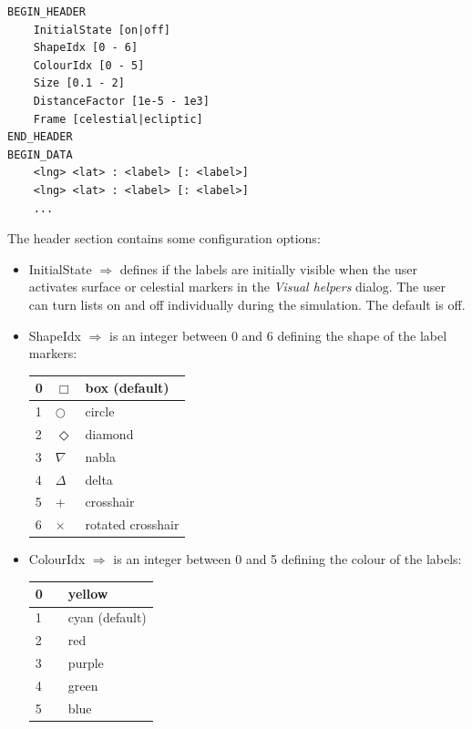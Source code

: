 \documentclass[Orbiter Developer Manual.tex]{subfiles}
\begin{document}
\begin{lstlisting}[language=OSFS]
BEGIN_HEADER
	InitialState [on|off]
	ShapeIdx [0 - 6]
	ColourIdx [0 - 5]
	Size [0.1 - 2]
	DistanceFactor [1e-5 - 1e3]
	Frame [celestial|ecliptic]
END_HEADER
BEGIN_DATA
	<lng> <lat> : <label> [: <label>]
	<lng> <lat> : <label> [: <label>]
	...
\end{lstlisting}

\noindent
The header section contains some configuration options:

\begin{itemize}
\item InitialState $\Rightarrow$ defines if the labels are initially visible when the user activates surface or celestial markers in the \textit{Visual helpers} dialog. The user can turn lists on and off individually during the simulation. The default is off.
\item ShapeIdx $\Rightarrow$ is an integer between 0 and 6 defining the shape of the label markers:

	\begin{longtable}{ |p{}|p{}|p{}| }
	\hline\rule{0pt}{2ex}
	0 & $\Box$ & box (default)\\
	\hline\rule{0pt}{2ex}
	1 & $\bigcirc$ & circle\\
	\hline\rule{0pt}{2ex}
	2 & $\Diamond$ & diamond\\
	\hline\rule{0pt}{2ex}
	3 & $\nabla$ & nabla\\
	\hline\rule{0pt}{2ex}
	4 & $\Delta$ & delta\\
	\hline\rule{0pt}{2ex}
	5 & + & crosshair\\
	\hline\rule{0pt}{2ex}
	6 & $\times$ & rotated crosshair\\
	\hline
	\end{longtable}

\item ColourIdx $\Rightarrow$ is an integer between 0 and 5 defining the colour of the labels:

	\begin{longtable}{ |p{}|p{}|p{}| }
	\hline\rule{0pt}{2ex}
	0 & \cellcolor[HTML]{FFFF00} & yellow\\
	\hline\rule{0pt}{2ex}
	1 & \cellcolor[HTML]{00FFFF} & cyan (default)\\
	\hline\rule{0pt}{2ex}
	2 & \cellcolor[HTML]{FF3F3F} & red\\
	\hline\rule{0pt}{2ex}
	3 & \cellcolor[HTML]{FF00FF} & purple\\
	\hline\rule{0pt}{2ex}
	4 & \cellcolor[HTML]{3FFF3F} & green\\
	\hline\rule{0pt}{2ex}
	5 & \cellcolor[HTML]{007FFF} & blue\\
	\hline
	\end{longtable}


\end{itemize}
\end{document}
